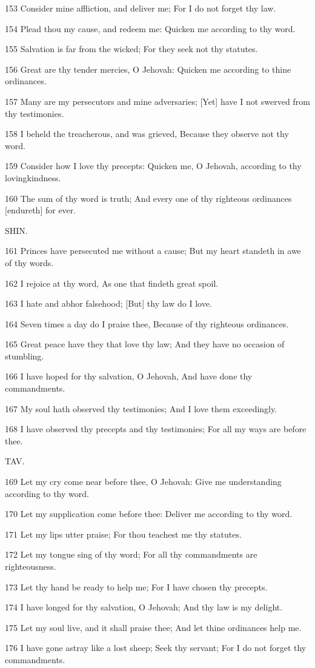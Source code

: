 \par 153 Consider mine affliction, and deliver me; For I do not forget thy law.
\par 154 Plead thou my cause, and redeem me: Quicken me according to thy word.
\par 155 Salvation is far from the wicked; For they seek not thy statutes.
\par 156 Great are thy tender mercies, O Jehovah: Quicken me according to thine ordinances.
\par 157 Many are my persecutors and mine adversaries; [Yet] have I not swerved from thy testimonies.
\par 158 I beheld the treacherous, and was grieved, Because they observe not thy word.
\par 159 Consider how I love thy precepts: Quicken me, O Jehovah, according to thy lovingkindness.
\par 160 The sum of thy word is truth; And every one of thy righteous ordinances [endureth] for ever.

\par SHIN.

\par 161 Princes have persecuted me without a cause; But my heart standeth in awe of thy words.
\par 162 I rejoice at thy word, As one that findeth great spoil.
\par 163 I hate and abhor falsehood; [But] thy law do I love.
\par 164 Seven times a day do I praise thee, Because of thy righteous ordinances.
\par 165 Great peace have they that love thy law; And they have no occasion of stumbling.
\par 166 I have hoped for thy salvation, O Jehovah, And have done thy commandments.
\par 167 My soul hath observed thy testimonies; And I love them exceedingly.
\par 168 I have observed thy precepts and thy testimonies; For all my ways are before thee.

\par TAV.

\par 169 Let my cry come near before thee, O Jehovah: Give me understanding according to thy word.
\par 170 Let my supplication come before thee: Deliver me according to thy word.
\par 171 Let my lips utter praise; For thou teachest me thy statutes.
\par 172 Let my tongue sing of thy word; For all thy commandments are righteousness.
\par 173 Let thy hand be ready to help me; For I have chosen thy precepts.
\par 174 I have longed for thy salvation, O Jehovah; And thy law is my delight.
\par 175 Let my soul live, and it shall praise thee; And let thine ordinances help me.
\par 176 I have gone astray like a lost sheep; Seek thy servant; For I do not forget thy commandments.

